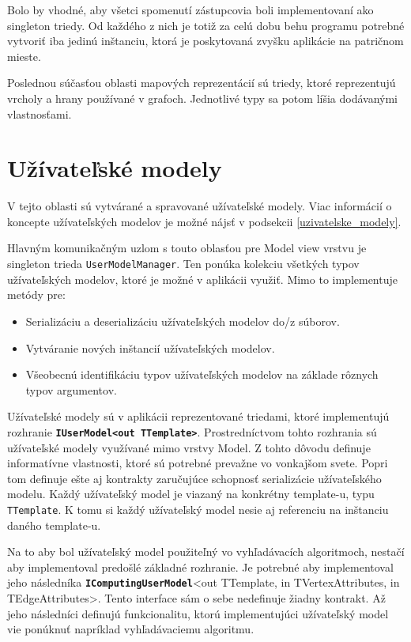 Bolo by vhodné, aby všetci spomenutí zástupcovia boli implementovaní ako singleton triedy. Od každého z nich je totiž za celú dobu behu programu potrebné vytvoriť iba jedinú inštanciu, ktorá je poskytovaná zvyšku aplikácie na patričnom mieste.

Poslednou súčasťou oblasti mapových reprezentácií sú triedy, ktoré reprezentujú vrcholy a hrany používané v grafoch. Jednotlivé typy sa potom líšia dodávanými vlastnosťami.   

\section{Užívateľské modely}

V tejto oblasti sú vytvárané a spravované užívateľské modely. Viac informácií o koncepte užívateľských modelov je možné nájsť v podsekcii \ref{uzivatelske_modely}.

Hlavným komunikačným uzlom s touto oblasťou pre Model view vrstvu je singleton trieda \texttt{UserModelManager}. Ten ponúka kolekciu všetkých typov užívateľských modelov, ktoré je možné v aplikácii využiť. Mimo to implementuje metódy pre:
\begin{itemize}
    \item Serializáciu a deserializáciu užívateľských modelov do/z súborov.
    \item Vytváranie nových inštancií užívateľských modelov.
    \item Všeobecnú identifikáciu typov užívateľských modelov na základe rôznych typov argumentov.
\end{itemize}

\bigskip

Užívateľské modely sú v aplikácii reprezentované triedami, ktoré implementujú rozhranie \textbf{\texttt{IUserModel<out TTemplate>}}.  Prostredníctvom tohto rozhrania sú užívateľské modely využívané mimo vrstvy Model. Z tohto dôvodu definuje informatívne vlastnosti, ktoré sú potrebné prevažne vo vonkajšom svete. Popri tom definuje ešte aj kontrakty zaručujúce schopnosť serializácie užívateľského modelu. Každý užívateľský model je viazaný na konkrétny template-u, typu \texttt{TTemplate}. K tomu si každý užívateľský model nesie aj referenciu na inštanciu daného template-u.

Na to aby bol užívateľský model použiteľný vo vyhľadávacích algoritmoch, nestačí aby implementoval predošlé základné rozhranie. Je potrebné aby implementoval jeho následníka \textbf{\texttt{IComputingUserModel}}<out TTemplate, in TVertexAttributes, in TEdgeAttributes>. Tento interface sám o sebe nedefinuje žiadny kontrakt. Až jeho následníci definujú funkcionalitu, ktorú implementujúci užívateľský model vie ponúknuť napríklad vyhľadávaciemu algoritmu. 

